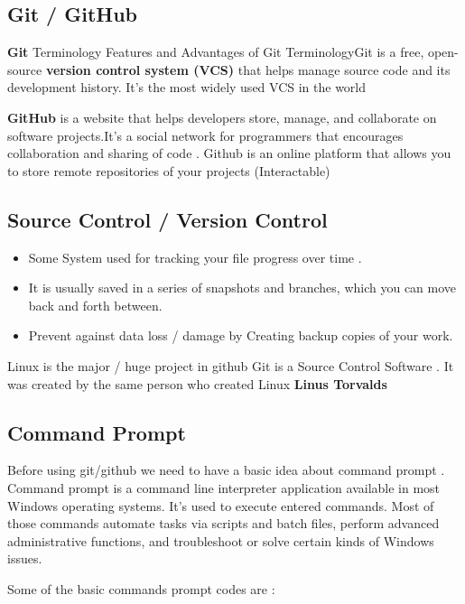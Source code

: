 \documentclass[
]{article}
\providecommand{\tightlist}{%
  \setlength{\itemsep}{0pt}\setlength{\parskip}{0pt}}
\begin{document}
\subsection{Git / GitHub}\label{git-github-1}

\textbf{Git} Terminology Features and Advantages of Git TerminologyGit
is a free, open-source \textbf{version control system (VCS)} that helps
manage source code and its development history. It's the most widely
used VCS in the world

\textbf{GitHub} is a website that helps developers store, manage, and
collaborate on software projects.It's a social network for programmers
that encourages collaboration and sharing of code . Github is an online
platform that allows you to store remote repositories of your projects
(Interactable)

\subsection{Source Control / Version
Control}\label{source-control-version-control}

\begin{itemize}
\tightlist
\item
  Some System used for tracking your file progress over time .
\item
  It is usually saved in a series of snapshots and branches, which you
  can move back and forth between.
\item
  Prevent against data loss / damage by Creating backup copies of your
  work.
\end{itemize}

Linux is the major / huge project in github Git is a Source Control
Software . It was created by the same person who created Linux
\textbf{Linus Torvalds}

\subsection{Command Prompt}\label{command-prompt}

Before using git/github we need to have a basic idea about command
prompt . Command prompt is a command line interpreter application
available in most Windows operating systems. It's used to execute
entered commands. Most of those commands automate tasks via scripts and
batch files, perform advanced administrative functions, and troubleshoot
or solve certain kinds of Windows issues.

Some of the basic commands prompt codes are :
\end{document}
